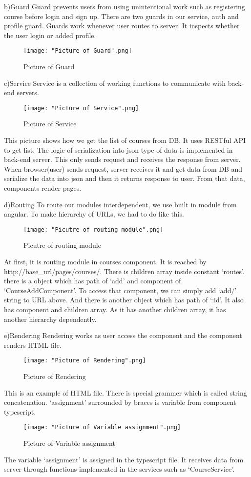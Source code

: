 \documentclass[10pt,journal,compsoc]{IEEEtran}
\begin{document}
\null\qquad 	b)Guard
Guard prevents users from using unintentional work such as registering course before login and sign up. There are two guards in our service, auth and profile guard. Guards work whenever user routes to server. It inspects whether the user login or added profile.
\begin{figure}[H]
\centering
\texttt{[image: "Picture of Guard".png]}
{\caption*{Picture of Guard}}
\end{figure}


\null\qquad 	c)Service
Service is a collection of working functions to communicate with back-end servers.
\begin{figure}[H]
\centering
\texttt{[image: "Picture of Service".png]}
{\caption*{Picture of Service}}
\end{figure}
This picture shows how we get the list of courses from DB. It uses RESTful API to get list. The logic of serialization into json type of data is implemented in back-end server. This only sends request and receives the response from server.\\
When browser(user) sends request, server receives it and get data from DB and serialize the data into json and then it returns response to user. From that data, components render pages.


\null\qquad 	d)Routing
To route our modules interdependent, we use built in module from angular. To make hierarchy of URLs, we had to do like this.
\begin{figure}[H]
\centering
\texttt{[image: "Picutre of routing module".png]}
{\caption*{Picutre of routing module}}
\end{figure}
At first, it is routing module in courses component. It is reached by http://base\_url/pages/courses/. There is children array inside constant ‘routes’. there is a object which has path of ‘add’ and component of ‘CourseAddComponent’. To access that component, we can simply add ‘add/’ string to URL above. And there is another object which has path of ‘:id’. It also has component and children array. As it has another children array, it has another hierarchy dependently.


\null\qquad 	e)Rendering
Rendering works as user access the component and the component renders HTML file.
\begin{figure}[H]
\centering
\texttt{[image: "Picture of Rendering".png]}
{\caption*{Picture of Rendering}}
\end{figure}
This is an example of HTML file. There is special grammer which is called string concatenation. ‘assignment’ surrounded by braces is variable from component typescript.
\begin{figure}[H]
\centering
\texttt{[image: "Picture of Variable assignment".png]}
{\caption*{Picture of Variable assignment}}
\end{figure}
The variable ‘assignment’ is assigned in the typescript file. It receives data from server through functions implemented in the services such as ‘CourseService’.
\end{document}
